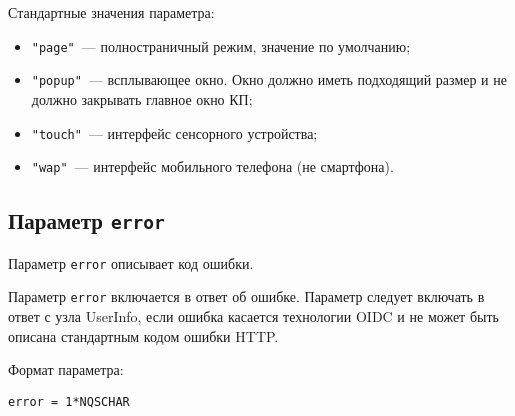Стандартные значения параметра:
%
\begin{itemize}
\item
\lstinline{"page"}~--- полностраничный режим, значение по умолчанию;

\item
\lstinline{"popup"}~--- 
всплывающее окно. Окно должно иметь подходящий размер и не должно 
закрывать главное окно КП;

\item
\lstinline{"touch"}~---
интерфейс сенсорного устройства;

\item
\lstinline{"wap"}~---
интерфейс мобильного телефона (не смартфона).
\end{itemize}

\subsection{Параметр \lstinline{error}}\label{PARAMS.Error}

Параметр \lstinline{error} описывает код ошибки.

Параметр \lstinline{error} включается в ответ об ошибке.
%
Параметр следует включать в ответ с узла UserInfo, если ошибка касается 
технологии OIDC и не может быть описана стандартным кодом ошибки HTTP.

Формат параметра:
\begin{lstlisting}
error = 1*NQSCHAR
\end{lstlisting}

